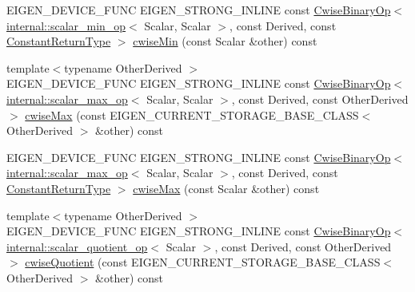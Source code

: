 \begin{DoxyCompactItemize}
\item 
E\+I\+G\+E\+N\+\_\+\+D\+E\+V\+I\+C\+E\+\_\+\+F\+U\+NC E\+I\+G\+E\+N\+\_\+\+S\+T\+R\+O\+N\+G\+\_\+\+I\+N\+L\+I\+NE const \mbox{\hyperlink{class_eigen_1_1_cwise_binary_op}{Cwise\+Binary\+Op}}$<$ \mbox{\hyperlink{struct_eigen_1_1internal_1_1scalar__min__op}{internal\+::scalar\+\_\+min\+\_\+op}}$<$ Scalar, Scalar $>$, const Derived, const \mbox{\hyperlink{class_eigen_1_1_cwise_nullary_op}{Constant\+Return\+Type}} $>$ \mbox{\hyperlink{class_eigen_1_1_sparse_matrix_base_a421fe17d1d5abf656b1630910788268f}{cwise\+Min}} (const Scalar \&other) const
\item 
{\footnotesize template$<$typename Other\+Derived $>$ }\\E\+I\+G\+E\+N\+\_\+\+D\+E\+V\+I\+C\+E\+\_\+\+F\+U\+NC E\+I\+G\+E\+N\+\_\+\+S\+T\+R\+O\+N\+G\+\_\+\+I\+N\+L\+I\+NE const \mbox{\hyperlink{class_eigen_1_1_cwise_binary_op}{Cwise\+Binary\+Op}}$<$ \mbox{\hyperlink{struct_eigen_1_1internal_1_1scalar__max__op}{internal\+::scalar\+\_\+max\+\_\+op}}$<$ Scalar, Scalar $>$, const Derived, const Other\+Derived $>$ \mbox{\hyperlink{class_eigen_1_1_sparse_matrix_base_a79030f983f007807e976cc0049164094}{cwise\+Max}} (const E\+I\+G\+E\+N\+\_\+\+C\+U\+R\+R\+E\+N\+T\+\_\+\+S\+T\+O\+R\+A\+G\+E\+\_\+\+B\+A\+S\+E\+\_\+\+C\+L\+A\+SS$<$ Other\+Derived $>$ \&other) const
\item 
E\+I\+G\+E\+N\+\_\+\+D\+E\+V\+I\+C\+E\+\_\+\+F\+U\+NC E\+I\+G\+E\+N\+\_\+\+S\+T\+R\+O\+N\+G\+\_\+\+I\+N\+L\+I\+NE const \mbox{\hyperlink{class_eigen_1_1_cwise_binary_op}{Cwise\+Binary\+Op}}$<$ \mbox{\hyperlink{struct_eigen_1_1internal_1_1scalar__max__op}{internal\+::scalar\+\_\+max\+\_\+op}}$<$ Scalar, Scalar $>$, const Derived, const \mbox{\hyperlink{class_eigen_1_1_cwise_nullary_op}{Constant\+Return\+Type}} $>$ \mbox{\hyperlink{class_eigen_1_1_sparse_matrix_base_aa9a80f82024c49bf896a8e9422d96a3b}{cwise\+Max}} (const Scalar \&other) const
\item 
{\footnotesize template$<$typename Other\+Derived $>$ }\\E\+I\+G\+E\+N\+\_\+\+D\+E\+V\+I\+C\+E\+\_\+\+F\+U\+NC E\+I\+G\+E\+N\+\_\+\+S\+T\+R\+O\+N\+G\+\_\+\+I\+N\+L\+I\+NE const \mbox{\hyperlink{class_eigen_1_1_cwise_binary_op}{Cwise\+Binary\+Op}}$<$ \mbox{\hyperlink{struct_eigen_1_1internal_1_1scalar__quotient__op}{internal\+::scalar\+\_\+quotient\+\_\+op}}$<$ Scalar $>$, const Derived, const Other\+Derived $>$ \mbox{\hyperlink{class_eigen_1_1_sparse_matrix_base_ac8065bebfa7102bc138a177b1209e86f}{cwise\+Quotient}} (const E\+I\+G\+E\+N\+\_\+\+C\+U\+R\+R\+E\+N\+T\+\_\+\+S\+T\+O\+R\+A\+G\+E\+\_\+\+B\+A\+S\+E\+\_\+\+C\+L\+A\+SS$<$ Other\+Derived $>$ \&other) const

\end{DoxyCompactItemize}
